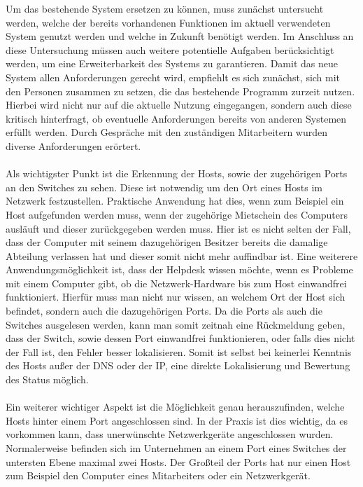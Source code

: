 Um das bestehende System ersetzen zu können, muss zunächst untersucht werden, welche der bereits vorhandenen Funktionen im aktuell verwendeten System genutzt werden und welche in Zukunft benötigt werden.
Im Anschluss an diese Untersuchung müssen auch weitere potentielle Aufgaben berücksichtigt werden, um eine Erweiterbarkeit des Systems zu garantieren.
Damit das neue System allen Anforderungen gerecht wird, empfiehlt es sich zunächst, sich mit den Personen zusammen zu setzen, die das bestehende Programm zurzeit nutzen.\\
Hierbei wird nicht nur auf die aktuelle Nutzung eingegangen, sondern auch diese kritisch hinterfragt, ob eventuelle Anforderungen bereits von anderen Systemen erfüllt werden.
Durch Gespräche mit den zuständigen Mitarbeitern wurden diverse Anforderungen erörtert.\\\\
Als wichtigster Punkt ist die Erkennung der Hosts, sowie der zugehörigen Ports an den Switches zu sehen.
Diese ist notwendig um den Ort eines Hosts im Netzwerk festzustellen. Praktische Anwendung hat dies, wenn zum Beispiel ein Host aufgefunden werden muss, wenn der zugehörige Mietschein des Computers ausläuft und dieser zurückgegeben werden muss.
Hier ist es nicht selten der Fall, dass der Computer mit seinem dazugehörigen Besitzer bereits die damalige Abteilung verlassen hat und dieser somit nicht mehr auffindbar ist.
Eine weiterere Anwendungsmöglichkeit ist, dass der Helpdesk wissen möchte, wenn es Probleme mit einem Computer gibt, ob die Netzwerk-Hardware bis zum Host einwandfrei funktioniert. Hierfür muss man nicht nur wissen, an welchem Ort der Host sich befindet, sondern auch die dazugehörigen Ports.
Da die Ports als auch die Switches ausgelesen werden, kann man somit zeitnah eine Rückmeldung geben, dass der Switch, sowie dessen Port einwandfrei funktionieren, oder falls dies nicht der Fall ist, den Fehler besser lokalisieren. Somit ist selbst bei keinerlei Kenntnis des Hosts außer der DNS oder der IP, eine direkte Lokalisierung und Bewertung des Status möglich.\\\\
Ein weiterer wichtiger Aspekt ist die Möglichkeit genau herauszufinden, welche Hosts hinter einem Port angeschlossen sind.
In der Praxis ist dies wichtig, da es vorkommen kann, dass unerwünschte Netzwerkgeräte angeschlossen wurden.
Normalerweise befinden sich im Unternehmen an einem Port eines Switches der untersten Ebene maximal zwei Hosts. Der Großteil der Ports hat nur einen Host zum Beispiel den Computer eines Mitarbeiters oder ein Netzwerkgerät.
